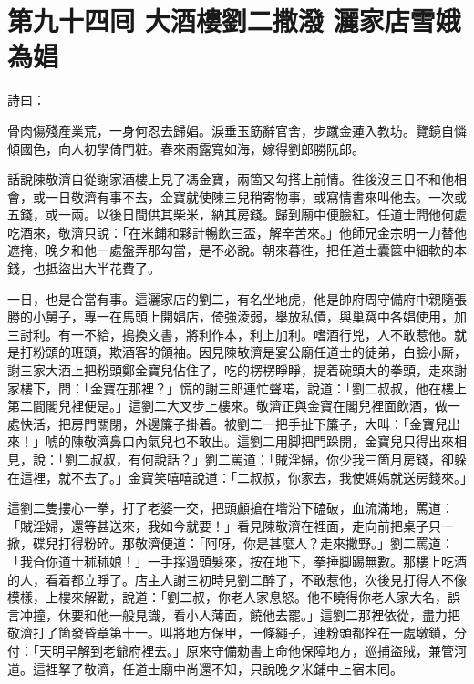 
\chapter*{第九十四囘 大酒樓劉二撒潑 灑家店雪娥為娼}


詩曰：

骨肉傷殘產業荒，一身何忍去歸娼。淚垂玉筯辭官舍，步蹴金蓮入教坊。覽鏡自憐傾國色，向人初學倚門粧。春來雨露寬如海，嫁得劉郎勝阮郎。

話說陳敬濟自從謝家酒樓上見了馮金寶，兩箇又勾搭上前情。徃後沒三日不和他相會，或一日敬濟有事不去，金寶就使陳三兒稍寄物事，或寫情書來叫他去。一次或五錢，或一兩。以後日間供其柴米，納其房錢。歸到廟中便臉紅。任道士問他何處吃酒來，敬濟只說：「在米鋪和夥計暢飲三盃，解辛苦來。」他師兄金宗明一力替他遮掩，晚夕和他一處盤弄那勾當，是不必說。朝來暮徃，把任道士囊篋中細軟的本錢，也抵盜出大半花費了。

一日，也是合當有事。這灑家店的劉二，有名坐地虎，他是帥府周守備府中親隨張勝的小舅子，專一在馬頭上開娼店，倚強淩弱，舉放私債，與巢窩中各娼使用，加三討利。有一不給，搗換文書，將利作本，利上加利。嗜酒行兇，人不敢惹他。就是打粉頭的班頭，欺酒客的領袖。因見陳敬濟是宴公廟任道士的徒弟，白臉小厮，謝三家大酒上把粉頭鄭金寶兒佔住了，吃的楞楞睜睜，提着碗頭大的拳頭，{}走來謝家樓下，問：「金寶在那裡？」慌的謝三郎連忙聲喏，說道：「劉二叔叔，他在樓上第二間閣兒裡便是。」這劉二大叉步上樓來。敬濟正與金寶在閣兒裡面飲酒，做一處快活，把房門關閉，外邊簾子掛着。被劉二一把手扯下簾子，大叫：「金寶兒出來！」唬的陳敬濟鼻口內氣兒也不敢出。這劉二用脚把門跺開，金寶兒只得出來相見，說：「劉二叔叔，有何說話？」劉二罵道：「賊淫婦，你少我三箇月房錢，卻躲在這裡，就不去了。」金寶笑嘻嘻說道：「二叔叔，你家去，我使媽媽就送房錢來。」

這劉二隻摟心一拳，打了老婆一交，把頭顱搶在堦沿下磕破，血流滿地，罵道：「賊淫婦，還等甚送來，我如今就要！」看見陳敬濟在裡面，走向前把桌子只一掀，碟兒打得粉碎。那敬濟便道：「阿呀，你是甚麼人？走來撒野。」劉二罵道：「我㒲你道士秫秫娘！」一手採過頭髮來，按在地下，拳捶脚踢無數。那樓上吃酒的人，看着都立睜了。店主人謝三初時見劉二醉了，不敢惹他，次後見打得人不像模樣，上樓來解勸，說道：「劉二叔，你老人家息怒。他不曉得你老人家大名，誤言冲撞，休要和他一般見識，看小人薄面，饒他去罷。」這劉二那裡依從，盡力把敬濟打了箇發昏章第十一。叫將地方保甲，一條繩子，連粉頭都拴在一處墩鎖，分付：「天明早解到老爺府裡去。」原來守備勑書上命他保障地方，巡捕盜賊，兼管河道。這裡拏了敬濟，任道士廟中尚還不知，只說晚夕米鋪中上宿未囘。

